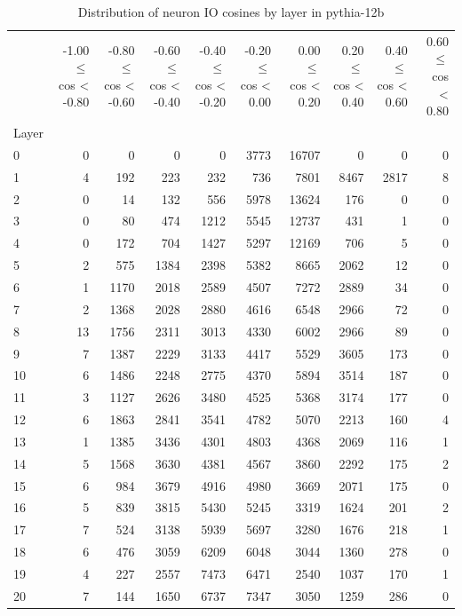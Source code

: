 \begin{table}
\caption{Distribution of neuron IO cosines by layer in pythia-12b}
\label{tab:pythia-12b_half_coarse}
\begin{tabular}{lrrrrrrrrr}
 & -1.00 $\leq$ cos < -0.80 & -0.80 $\leq$ cos < -0.60 & -0.60 $\leq$ cos < -0.40 & -0.40 $\leq$ cos < -0.20 & -0.20 $\leq$ cos < 0.00 & 0.00 $\leq$ cos < 0.20 & 0.20 $\leq$ cos < 0.40 & 0.40 $\leq$ cos < 0.60 & 0.60 $\leq$ cos < 0.80 \\
Layer &  &  &  &  &  &  &  &  &  \\
0 & 0 & 0 & 0 & 0 & 3773 & 16707 & 0 & 0 & 0 \\
1 & 4 & 192 & 223 & 232 & 736 & 7801 & 8467 & 2817 & 8 \\
2 & 0 & 14 & 132 & 556 & 5978 & 13624 & 176 & 0 & 0 \\
3 & 0 & 80 & 474 & 1212 & 5545 & 12737 & 431 & 1 & 0 \\
4 & 0 & 172 & 704 & 1427 & 5297 & 12169 & 706 & 5 & 0 \\
5 & 2 & 575 & 1384 & 2398 & 5382 & 8665 & 2062 & 12 & 0 \\
6 & 1 & 1170 & 2018 & 2589 & 4507 & 7272 & 2889 & 34 & 0 \\
7 & 2 & 1368 & 2028 & 2880 & 4616 & 6548 & 2966 & 72 & 0 \\
8 & 13 & 1756 & 2311 & 3013 & 4330 & 6002 & 2966 & 89 & 0 \\
9 & 7 & 1387 & 2229 & 3133 & 4417 & 5529 & 3605 & 173 & 0 \\
10 & 6 & 1486 & 2248 & 2775 & 4370 & 5894 & 3514 & 187 & 0 \\
11 & 3 & 1127 & 2626 & 3480 & 4525 & 5368 & 3174 & 177 & 0 \\
12 & 6 & 1863 & 2841 & 3541 & 4782 & 5070 & 2213 & 160 & 4 \\
13 & 1 & 1385 & 3436 & 4301 & 4803 & 4368 & 2069 & 116 & 1 \\
14 & 5 & 1568 & 3630 & 4381 & 4567 & 3860 & 2292 & 175 & 2 \\
15 & 6 & 984 & 3679 & 4916 & 4980 & 3669 & 2071 & 175 & 0 \\
16 & 5 & 839 & 3815 & 5430 & 5245 & 3319 & 1624 & 201 & 2 \\
17 & 7 & 524 & 3138 & 5939 & 5697 & 3280 & 1676 & 218 & 1 \\
18 & 6 & 476 & 3059 & 6209 & 6048 & 3044 & 1360 & 278 & 0 \\
19 & 4 & 227 & 2557 & 7473 & 6471 & 2540 & 1037 & 170 & 1 \\
20 & 7 & 144 & 1650 & 6737 & 7347 & 3050 & 1259 & 286 & 0 \\

\end{tabular}
\end{table}
